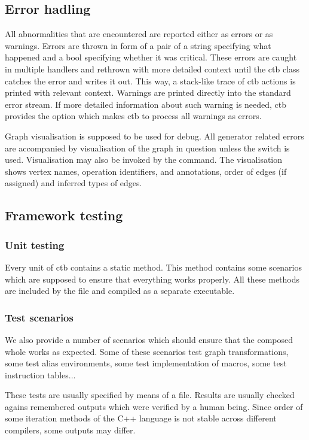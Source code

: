 \subsection*{Error hadling}
All abnormalities that are encountered are reported either as errors or as warnings. Errors are thrown in form of a pair of a string specifying what happened and a bool specifying whether it was critical. These errors are caught in multiple  handlers and rethrown with more detailed context until the ctb class catches the error and writes it out. This way, a stack-like trace of ctb actions is printed with relevant context.  Warnings are printed directly into the standard error stream. If more detailed information about such warning is needed, ctb provides the  option which makes ctb to process all warnings as errors. 

Graph visualisation is supposed to be used for debug. All generator related errors are accompanied by visualisation of the graph in question unless the  switch is used. Visualisation may also be invoked by the  command. The visualisation shows vertex names, operation identifiers,  and  annotations, order of edges (if assigned) and inferred types of edges.

\subsection*{Framework testing}

\subsubsection{Unit testing}
Every unit of ctb contains a static  method. This method contains some scenarios which are supposed to ensure that everything works properly. All these methods are included by the  file and compiled as a separate executable.

\subsubsection{Test scenarios}
We also provide a number of scenarios which should ensure that the composed whole works as expected. Some of these scenarios test graph transformations, some test alias environments, some test implementation of macros, some test instruction tables...

These tests are usually specified by means of a  file. Results are usually checked agains remembered outputs which were verified by a human being. Since order of some iteration methods of the C++ language is not stable across different compilers, some outputs may differ.

